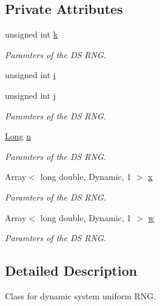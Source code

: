 \subsection*{Private Attributes}
\begin{DoxyCompactItemize}
\item 
unsigned int \hyperlink{class_c_dynamic_system_r_n_g_ae8946db15d06d35b9080109bab84001c}{k}
\begin{DoxyCompactList}\small\item\em Paramters of the D\-S R\-N\-G. \end{DoxyCompactList}\item 
unsigned int \hyperlink{class_c_dynamic_system_r_n_g_a37d2707ee07015679697a2d9f1a2d4cd}{i}
\item 
unsigned int \hyperlink{class_c_dynamic_system_r_n_g_aec60b65b9e76642d7a36198e888d7e39}{j}
\begin{DoxyCompactList}\small\item\em Paramters of the D\-S R\-N\-G. \end{DoxyCompactList}\item 
\hyperlink{class_c_dynamic_system_r_n_g_ab5df6da5f9eaeb3d9cddc97405a09995}{Long} \hyperlink{class_c_dynamic_system_r_n_g_a8cdc452f933711c4146f9b6f8e9b53f2}{n}
\begin{DoxyCompactList}\small\item\em Paramters of the D\-S R\-N\-G. \end{DoxyCompactList}\item 
Array$<$ long double, Dynamic, 1 $>$ \hyperlink{class_c_dynamic_system_r_n_g_a41e389e017d88e1955ad45d237533560}{x}
\begin{DoxyCompactList}\small\item\em Paramters of the D\-S R\-N\-G. \end{DoxyCompactList}\item 
Array$<$ long double, Dynamic, 1 $>$ \hyperlink{class_c_dynamic_system_r_n_g_ad6d910566305fbb490cf785da19976e4}{w}
\begin{DoxyCompactList}\small\item\em Paramters of the D\-S R\-N\-G. \end{DoxyCompactList}\end{DoxyCompactItemize}


\subsection{Detailed Description}
Class for dynamic system uniform R\-N\-G. 

